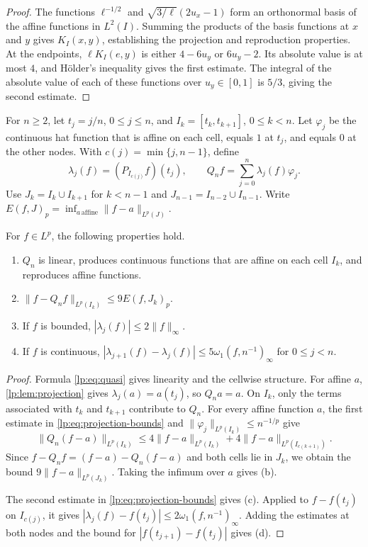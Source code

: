 \documentclass[11pt,a4paper]{article}
\begin{document}
\begin{proof}
The functions $\ell^{-1/2}$ and $\sqrt{3/\ell}(2u_x-1)$ form an orthonormal basis of the affine functions in $L^2(I)$. Summing the products of the basis functions at $x$ and $y$ gives $K_I(x,y)$, establishing the projection and reproduction properties. At the endpoints, $\ell K_I(e,y)$ is either $4-6u_y$ or $6u_y-2$. Its absolute value is at most $4$, and Hölder's inequality gives the first estimate. The integral of the absolute value of each of these functions over $u_y\in[0,1]$ is $5/3$, giving the second estimate.
\end{proof}

For $n\ge2$, let $t_j=j/n$, $0\le j\le n$, and $I_k=[t_k,t_{k+1}]$, $0\le k<n$. Let $\varphi_j$ be the continuous hat function that is affine on each cell, equals $1$ at $t_j$, and equals $0$ at the other nodes. With $c(j)=\min\{j,n-1\}$, define
\begin{equation}
 \lambda_j(f)=(P_{I_{c(j)}}f)(t_j),
 \qquad Q_nf=\sum_{j=0}^n\lambda_j(f)\varphi_j .
 \label{lp:eq:quasi}
\end{equation}
Use $J_k=I_k\cup I_{k+1}$ for $k<n-1$ and $J_{n-1}=I_{n-2}\cup I_{n-1}$. Write $E(f,J)_p=\inf_{a\,\mathrm{affine}}\|f-a\|_{L^p(J)}$.

\begin{lema}
\label{lp:lem:quasi}
For $f\in L^p$, the following properties hold.
\begin{enumerate}[label=(\alph*)]
 \item $Q_n$ is linear, produces continuous functions that are affine on each cell $I_k$, and reproduces affine functions.
 \item $\|f-Q_nf\|_{L^p(I_k)}\le9E(f,J_k)_p$.
 \item If $f$ is bounded, $|\lambda_j(f)|\le2\|f\|_\infty$.
 \item If $f$ is continuous, $|\lambda_{j+1}(f)-\lambda_j(f)|\le5\omega_1(f,n^{-1})_\infty$ for $0\le j<n$.
\end{enumerate}
\end{lema}

\begin{proof}
Formula \eqref{lp:eq:quasi} gives linearity and the cellwise structure. For affine $a$, \cref{lp:lem:projection} gives $\lambda_j(a)=a(t_j)$, so $Q_na=a$. On $I_k$, only the terms associated with $t_k$ and $t_{k+1}$ contribute to $Q_n$. For every affine function $a$, the first estimate in \eqref{lp:eq:projection-bounds} and $\|\varphi_j\|_{L^p(I_k)}\le n^{-1/p}$ give
\[
 \|Q_n(f-a)\|_{L^p(I_k)}
 \le4\|f-a\|_{L^p(I_k)}+4\|f-a\|_{L^p(I_{c(k+1)})}.
\]
Since $f-Q_nf=(f-a)-Q_n(f-a)$ and both cells lie in $J_k$, we obtain the bound $9\|f-a\|_{L^p(J_k)}$. Taking the infimum over $a$ gives (b).

The second estimate in \eqref{lp:eq:projection-bounds} gives (c). Applied to $f-f(t_j)$ on $I_{c(j)}$, it gives
$|\lambda_j(f)-f(t_j)|\le2\omega_1(f,n^{-1})_\infty$. Adding the estimates at both nodes and the bound for $|f(t_{j+1})-f(t_j)|$ gives (d).
\end{proof}
\end{document}
